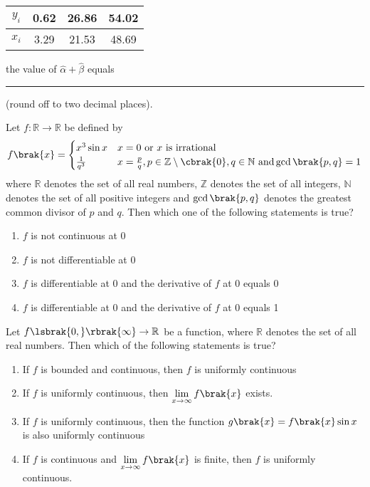 \begin{table}[h!]
\centering
\begin{tabular}{|c|c|c|c|}
    \hline
    $y_i$ & 0.62 & 26.86 & 54.02 \\
    \hline
    $x_i$ & 3.29 & 21.53 & 48.69 \\
    \hline
\end{tabular}    
\end{table}

the value of $\hat\alpha + \hat\beta$ equals \rule{1.0cm}{0.15mm}
(round off to two decimal places).

\item Let $f: \mathbb{R} \to \mathbb{R}$ be defined by
\begin{align*}
    f\brak{x} = 
    \begin{cases}
        x^3\sin x & \text{$x = 0$ or $x$ is irrational} \\
        \frac{1}{q^3} & x = \frac{p}{q}, p \in \mathbb{Z} \setminus \cbrak{0}, q \in \mathbb{N} \text{ and} \gcd\brak{p, q} = 1
    \end{cases}
\end{align*}
where $\mathbb{R}$ denotes the set of all real numbers, $\mathbb{Z}$ denotes the set of all integers, $\mathbb{N}$ denotes the
set of all positive integers and $\gcd\brak{p, q}$ denotes the greatest common divisor of $p$ and $q$. Then which one of the
following statements is true?

\begin{enumerate}
    \item $f$ is not continuous at 0
    \item $f$ is not differentiable at 0
    \item $f$ is differentiable at 0 and the derivative of $f$ at 0 equals 0
    \item $f$ is differentiable at 0 and the derivative of $f$ at 0 equals 1
\end{enumerate}

\item Let $f \lsbrak{0, }\rbrak{\infty} \to \mathbb{R}$ be a function, where $\mathbb{R}$ denotes the set of all real numbers.
Then which of the following statements is true?

\begin{enumerate}
    \item If $f$ is bounded and continuous, then $f$ is uniformly continuous
    \item If $f$ is uniformly continuous, then $\lim\limits_{x \to \infty} f\brak{x}$ exists.
    \item If $f$ is uniformly continuous, then the function $g\brak{x} = f\brak{x}\sin x$
    is also uniformly continuous
    \item If $f$ is continuous and $\lim\limits_{x \to \infty} f\brak{x}$ is finite, then
    $f$ is uniformly continuous.
\end{enumerate}

